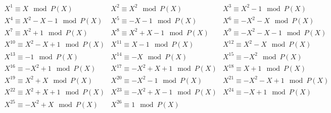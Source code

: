 $$\begin{array}{ccc}
X^{1} \equiv X \mod P(X) & X^{2} \equiv X^2 \mod P(X) & X^{3} \equiv X^2 - 1 \mod P(X) \\
X^{4} \equiv X^2 - X - 1 \mod P(X) & X^{5} \equiv - X - 1 \mod P(X) & X^{6} \equiv - X^2 - X \mod P(X) \\
X^{7} \equiv X^2 + 1 \mod P(X) & X^{8} \equiv X^2 + X - 1 \mod P(X) & X^{9} \equiv - X^2 - X - 1 \mod P(X) \\
X^{10} \equiv X^2 - X + 1 \mod P(X) & X^{11} \equiv X - 1 \mod P(X) & X^{12} \equiv X^2 - X \mod P(X) \\
X^{13} \equiv -1 \mod P(X) & X^{14} \equiv -X \mod P(X) & X^{15} \equiv -X^2 \mod P(X) \\
X^{16} \equiv - X^2 + 1 \mod P(X) & X^{17} \equiv - X^2 + X + 1 \mod P(X) & X^{18} \equiv X + 1 \mod P(X) \\
X^{19} \equiv X^2 + X \mod P(X) & X^{20} \equiv - X^2 - 1 \mod P(X) & X^{21} \equiv - X^2 - X + 1 \mod P(X) \\
X^{22} \equiv X^2 + X + 1 \mod P(X) & X^{23} \equiv - X^2 + X - 1 \mod P(X) & X^{24} \equiv - X + 1 \mod P(X) \\
X^{25} \equiv - X^2 + X \mod P(X) & X^{26} \equiv 1 \mod P(X) & \end{array}$$

